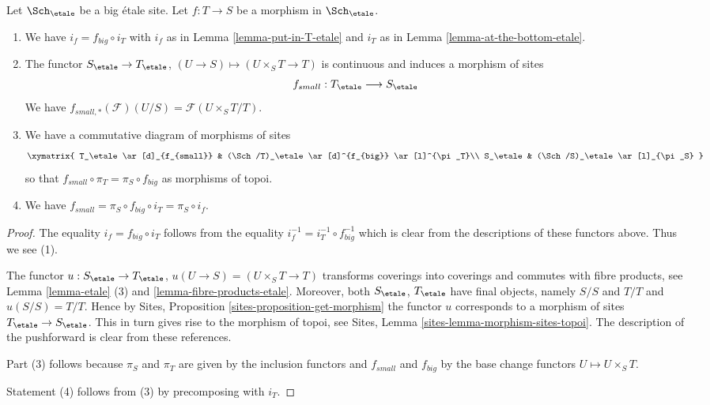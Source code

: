 \begin{lemma}
\label{lemma-morphism-big-small-etale}
Let $\Sch_\etale$ be a big \'etale site.
Let $f : T \to S$ be a morphism in $\Sch_\etale$.
\begin{enumerate}
\item We have $i_f = f_{big} \circ i_T$ with $i_f$ as in
Lemma \ref{lemma-put-in-T-etale} and $i_T$ as in
Lemma \ref{lemma-at-the-bottom-etale}.
\item The functor $S_\etale \to T_\etale$,
$(U \to S) \mapsto (U \times_S T \to T)$ is continuous and induces
a morphism of sites
$$
f_{small} : T_\etale \longrightarrow S_\etale
$$
We have $f_{small, *}(\mathcal{F})(U/S) = \mathcal{F}(U \times_S T/T)$.
\item We have a commutative diagram of morphisms of sites
$$
\xymatrix{
T_\etale \ar[d]_{f_{small}} &
(\Sch/T)_\etale \ar[d]^{f_{big}} \ar[l]^{\pi_T}\\
S_\etale &
(\Sch/S)_\etale \ar[l]_{\pi_S}
}
$$
so that $f_{small} \circ \pi_T = \pi_S \circ f_{big}$ as morphisms of topoi.
\item We have $f_{small} = \pi_S \circ f_{big} \circ i_T = \pi_S \circ i_f$.
\end{enumerate}
\end{lemma}

\begin{proof}
The equality $i_f = f_{big} \circ i_T$ follows from the
equality $i_f^{-1} = i_T^{-1} \circ f_{big}^{-1}$ which is
clear from the descriptions of these functors above.
Thus we see (1).

\medskip\noindent
The functor
$u :
S_\etale
\to
T_\etale$, $u(U \to S) = (U \times_S T \to T)$
transforms coverings into coverings and commutes with fibre products,
see Lemma \ref{lemma-etale} (3) and \ref{lemma-fibre-products-etale}.
Moreover, both $S_\etale$, $T_\etale$ have final objects,
namely $S/S$ and $T/T$ and $u(S/S) = T/T$. Hence by
Sites, Proposition \ref{sites-proposition-get-morphism}
the functor $u$ corresponds to a morphism of sites
$T_\etale \to S_\etale$. This in turn gives rise to the
morphism of topoi, see
Sites, Lemma \ref{sites-lemma-morphism-sites-topoi}. The description
of the pushforward is clear from these references.

\medskip\noindent
Part (3) follows because $\pi_S$ and $\pi_T$ are given by the
inclusion functors and $f_{small}$ and $f_{big}$ by the
base change functors $U \mapsto U \times_S T$.

\medskip\noindent
Statement (4) follows from (3) by precomposing with $i_T$.
\end{proof}

